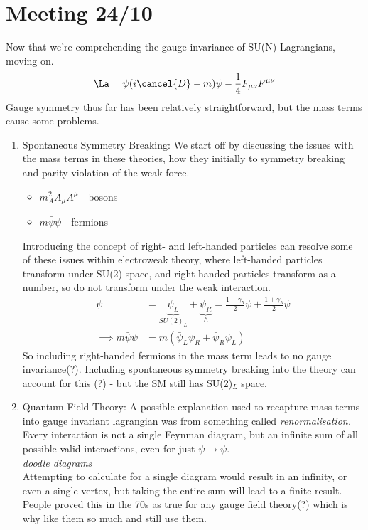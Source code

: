 \documentclass[a4paper, 11pt, normalem]{article}
\begin{document}
\section{Meeting 24/10}
Now that we're comprehending the gauge invariance of SU(N) Lagrangians, moving on. 
\begin{align}
    \La = \bar{\psi}(i\cancel{D}-m)\psi - \frac14 F_{\mu\nu}F^{\mu\nu}
\end{align}
Gauge symmetry thus far has been relatively straightforward, but the mass terms cause some problems.
\begin{enumerate}
    \item Spontaneous Symmetry Breaking: We start off by discussing the issues with the mass terms in these theories, how they initially to symmetry breaking and parity violation of the weak force. 
        \begin{itemize}
            \item $m_A^2A_\mu A^\mu$ - bosons
            \item $m\bar{\psi}\psi$ - fermions
        \end{itemize}
        Introducing the concept of right- and left-handed particles can resolve some of these issues within electroweak theory, where left-handed particles transform under SU(2) space, and right-handed particles transform as a number, so do not transform under the weak interaction. 
        \begin{align}
            \psi &= \underbrace{\psi_L}_{SU(2)_L} + \underbrace{\psi_R}_{\land} = \frac{1-\gamma_5}{2}\psi + \frac{1+\gamma_5}{2}\psi \\
            \implies m\bar{\psi}\psi &= m\left(\bar{\psi}_L\psi_R + \bar{\psi}_R\psi_L\right)
        \end{align}
        So including right-handed fermions in the mass term leads to no gauge invariance(?). 
        Including spontaneous symmetry breaking into the theory can account for this (?) - but the SM still has SU(2)$_L$ space.
    \item Quantum Field Theory: A possible explanation used to recapture mass terms into gauge invariant lagrangian was from something called \emph{renormalisation.} 
        Every interaction is not a single Feynman diagram, but an infinite sum of all possible valid interactions, even for just $\psi\to\psi$. \\
        \textit{doodle diagrams}\\
        Attempting to calculate for a single diagram would result in an infinity, or even a single vertex, but taking the entire sum will lead to a finite result. 
        People proved this in the 70s as true for any gauge field theory(?) which is why like them so much and still use them. 
\end{enumerate}
\end{document}
